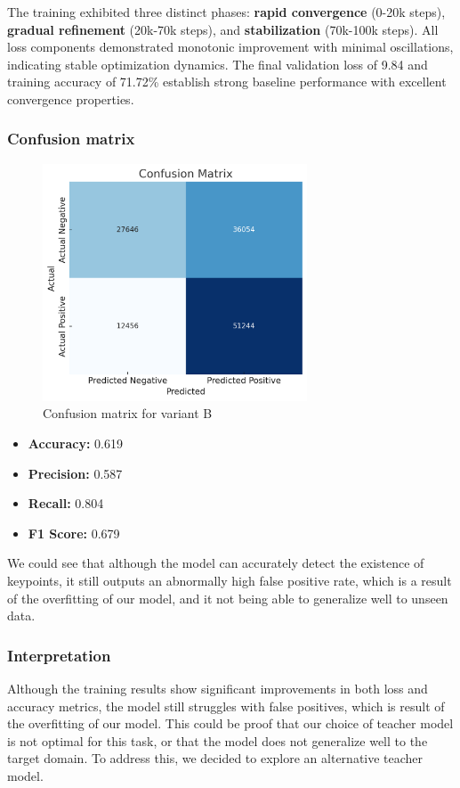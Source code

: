 The training exhibited three distinct phases: \textbf{rapid convergence} (0-20k
steps), \textbf{gradual refinement} (20k-70k steps), and \textbf{stabilization}
(70k-100k steps). All loss components demonstrated monotonic improvement with
minimal oscillations, indicating stable optimization dynamics. The final
validation loss of 9.84 and training accuracy of 71.72\% establish strong
baseline performance with excellent convergence properties.
\subsubsection{Confusion matrix}
\begin{figure}[H]
    \centering
    \includegraphics[width=0.7\textwidth]{ressources/confusion_matrix_3.png}
    \caption{Confusion matrix for variant B}
    \label{fig:confusion_matrix_3}
\end{figure}
\begin{itemize}
    \item \textbf{Accuracy: }0.619
    \item \textbf{Precision: }0.587
    \item \textbf{Recall: }0.804
    \item \textbf{F1 Score: }0.679
\end{itemize}
We could see that although the model can accurately detect the existence of keypoints, it still outputs an abnormally high false positive rate, which is a result of the overfitting of our model, and it not being able to generalize well to unseen data.
\subsubsection{Interpretation}
Although the training results show significant improvements in both loss and
accuracy metrics, the model still struggles with false positives, which is
result of the overfitting of our model. This could be proof that our choice of
teacher model is not optimal for this task, or that the model does not
generalize well to the target domain. To address this, we decided to explore an
alternative teacher model.
